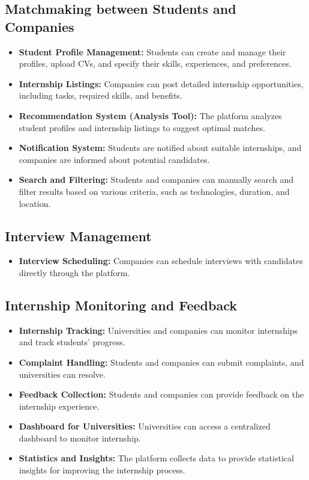 \subsection{Matchmaking between Students and Companies}
\begin{itemize}
    \item \textbf{Student Profile Management:} Students can create and manage their profiles, upload CVs, and specify their skills, experiences, and preferences.
    \item \textbf{Internship Listings:} Companies can post detailed internship opportunities, including tasks, required skills, and benefits.
    \item \textbf{Recommendation System (Analysis Tool):} The platform analyzes student profiles and internship listings to suggest optimal matches.
    \item \textbf{Notification System:} Students are notified about suitable internships, and companies are informed about potential candidates.
    \item \textbf{Search and Filtering:} Students and companies can manually search and filter results based on various criteria, such as technologies, duration, and location.
\end{itemize}

\subsection{Interview Management}
\begin{itemize}
    \item \textbf{Interview Scheduling:} Companies can schedule interviews with candidates directly through the platform.
\end{itemize}

\subsection{Internship Monitoring and Feedback}
\begin{itemize}
    \item \textbf{Internship Tracking:} Universities and companies can monitor internships and track students' progress.
    \item \textbf{Complaint Handling:} Students and companies can submit complaints, and universities can resolve.
    \item \textbf{Feedback Collection:} Students and companies can provide feedback on the internship experience.
    \item \textbf{Dashboard for Universities:} Universities can access a centralized dashboard to monitor internship.
    \item \textbf{Statistics and Insights:} The platform collects data to provide statistical insights for improving the internship process.
\end{itemize}

